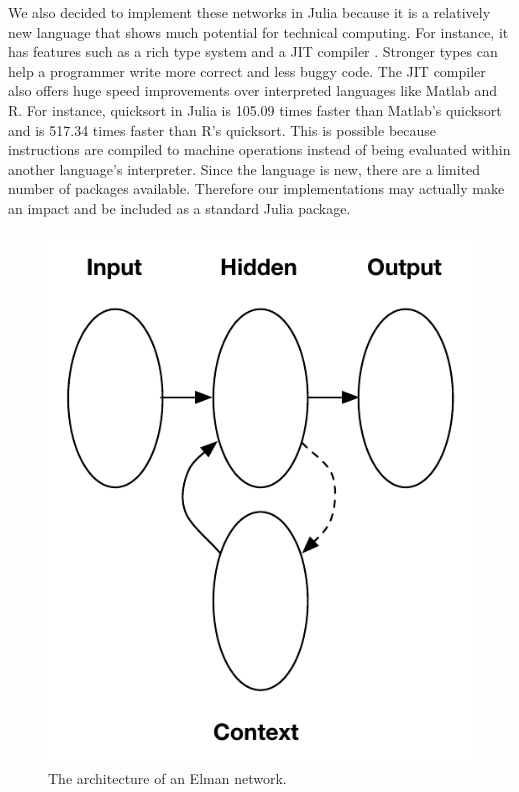 \documentclass{acm_proc_article-sp}
\begin{document}
We also decided to implement these networks in Julia because it is a relatively new language that shows much potential for technical computing. 
For instance, it has features such as a rich type system and a JIT compiler \cite{julia}. 
Stronger types can help a programmer write more correct and less buggy code. 
The JIT compiler also offers huge speed improvements over interpreted languages like Matlab and R. 
For instance, quicksort in Julia is 105.09 times faster than Matlab's quicksort and is 517.34 times faster than R's quicksort. 
This is possible because instructions are compiled to machine operations instead of being evaluated within another language's interpreter.
Since the language is new, there are a limited number of packages available. Therefore our implementations may actually make an impact and be included as a standard Julia package. 

\begin{figure}
\begin{center}
\includegraphics[scale=.8]{Images/elman.pdf}
\caption{The architecture of an Elman network.}
\label{fig:elman}
\end{center}
\end{figure}
\end{document}
